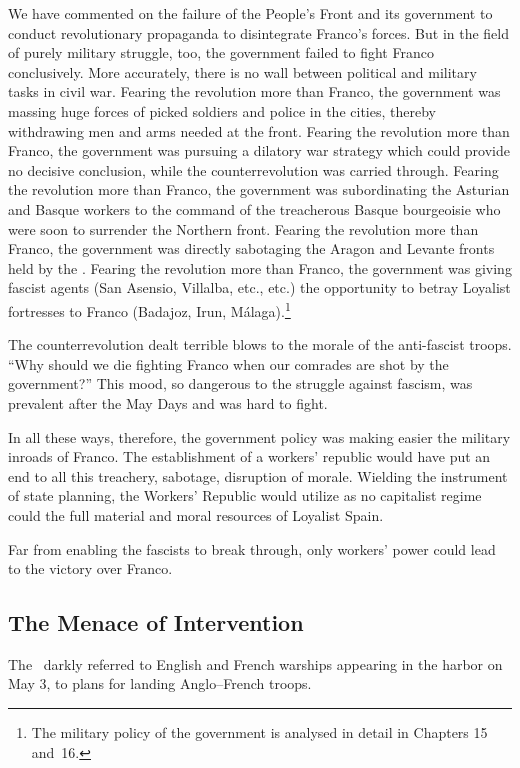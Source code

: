 We have commented on the failure of the People’s Front and its government to conduct revolutionary propaganda to disintegrate Franco’s forces. But in the field of purely military struggle, too, the government failed to fight Franco conclusively. More accurately, there is no wall between political and military tasks in civil war. Fear\-ing the revolution more than Franco, the government was massing huge forces of picked soldiers and police in the cities, thereby withdrawing men and arms needed at the front. Fearing the revolution more than Franco, the government was pursuing a dilatory war strategy which could provide no decisive conclusion, while the counterrevolution was carried through. Fearing the revolution more than Franco, the government was subordinating the Asturian and Basque workers to the command of the treacherous Basque bourgeoisie who were soon to surrender the Northern front. Fearing the revolution more than Franco, the government was directly sabotaging the Aragon and Levante fronts held by the \CNT\kn. Fearing the revolution more than Franco, the government was giving fascist agents (San Asensio, Villalba, etc., etc.) the opportunity to betray Loyalist fortresses to Franco (Badajoz, Irun, M\'alaga).\kn\kn\footnote{The military policy of the government is analysed in detail in Chapters 15 and~16.}

The counterrevolution dealt terrible blows to the morale of the anti-fascist troops. ``Why should we die fighting Franco when our comrades are shot by the government?'' This mood, so dangerous to the struggle against fascism, was prevalent after the May Days and was hard to fight.

In all these ways, therefore, the government policy was making easier the military inroads of Franco. The establishment of a workers’ republic would have put an end to all this treachery, sabotage, disruption of morale. Wielding the instrument of state planning, the Workers’ Republic would utilize as no capitalist regime could the full material and moral resources of Loyalist Spain.

Far from enabling the fascists to break through, only workers’ power could lead to the victory over Franco.

\subsection*{The Menace of Intervention}

The \CNT\ darkly referred to English and French warships appearing in the harbor on May 3, to plans for landing Anglo--French troops. 

